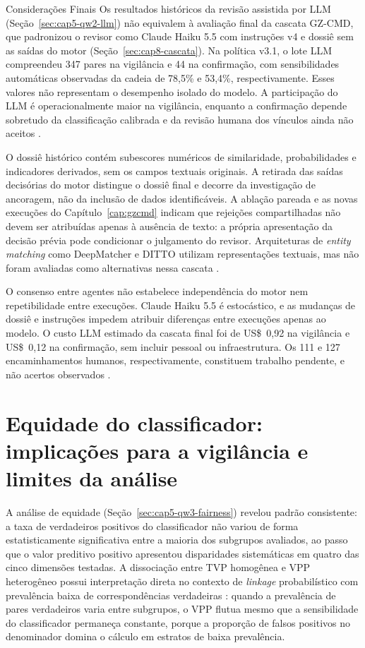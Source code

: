 \begin{chapter}{Considerações Finais}
Os resultados históricos da revisão assistida por LLM (Seção~\ref{sec:cap5-qw2-llm}) não equivalem à avaliação final da cascata GZ-CMD, que padronizou o revisor como Claude Haiku 5.5 com instruções v4 e dossiê sem as saídas do motor (Seção~\ref{sec:cap8-cascata}). Na política v3.1, o lote LLM compreendeu 347 pares na vigilância e 44 na confirmação, com sensibilidades automáticas observadas da cadeia de 78,5\% e 53,4\%, respectivamente. Esses valores não representam o desempenho isolado do modelo. A participação do LLM é operacionalmente maior na vigilância, enquanto a confirmação depende sobretudo da classificação calibrada e da revisão humana dos vínculos ainda não aceitos \cite{Jardim2026phdrepo}.

O dossiê histórico contém subescores numéricos de similaridade, probabilidades e indicadores derivados, sem os campos textuais originais. A retirada das saídas decisórias do motor distingue o dossiê final e decorre da investigação de ancoragem, não da inclusão de dados identificáveis. A ablação pareada e as novas execuções do Capítulo~\ref{cap:gzcmd} indicam que rejeições compartilhadas não devem ser atribuídas apenas à ausência de texto: a própria apresentação da decisão prévia pode condicionar o julgamento do revisor. Arquiteturas de \textit{entity matching} como DeepMatcher e DITTO utilizam representações textuais, mas não foram avaliadas como alternativas nessa cascata \cite{Mudgal2018deepmatcher,Li2020ditto,Jardim2026phdrepo}.

O consenso entre agentes não estabelece independência do motor nem repetibilidade entre execuções. Claude Haiku 5.5 é estocástico, e as mudanças de dossiê e instruções impedem atribuir diferenças entre execuções apenas ao modelo. O custo LLM estimado da cascata final foi de US\$~0,92 na vigilância e US\$~0,12 na confirmação, sem incluir pessoal ou infraestrutura. Os 111 e 127 encaminhamentos humanos, respectivamente, constituem trabalho pendente, e não acertos observados \cite{Jardim2026phdrepo}.

\section{Equidade do classificador: implicações para a vigilância e limites da análise}
\label{sec:cap6-qw3-fairness-discussion}

A análise de equidade (Seção~\ref{sec:cap5-qw3-fairness}) revelou padrão consistente: a taxa de verdadeiros positivos do classificador não variou de forma estatisticamente significativa entre a maioria dos subgrupos avaliados, ao passo que o valor preditivo positivo apresentou disparidades sistemáticas em quatro das cinco dimensões testadas.
A dissociação entre TVP homogênea e VPP heterogêneo possui interpretação direta no contexto de \textit{linkage} probabilístico com prevalência baixa de correspondências verdadeiras \cite{Chouldechova2017fair}: quando a prevalência de pares verdadeiros varia entre subgrupos, o VPP flutua mesmo que a sensibilidade do classificador permaneça constante, porque a proporção de falsos positivos no denominador domina o cálculo em estratos de baixa prevalência.


\end{chapter}
